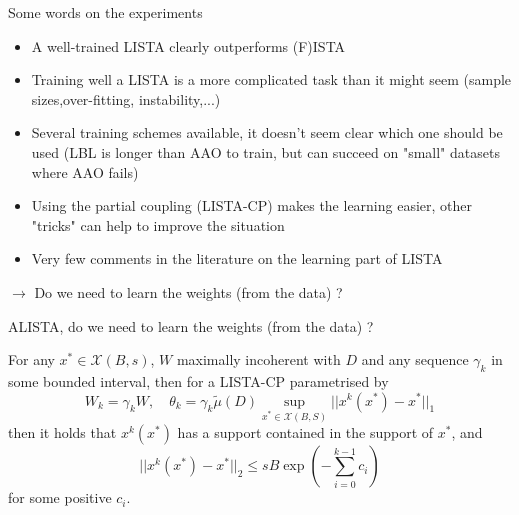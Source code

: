 \documentclass{beamer}
\begin{document}
\begin{frame}{Some words on the experiments}
    \begin{itemize}
        \item A well-trained LISTA clearly outperforms (F)ISTA
        \item Training well a LISTA is a more complicated task than it might seem (sample sizes,over-fitting, instability,...)
        \item Several training schemes available, it doesn't seem clear which one should be used (LBL is longer than AAO to train, but can succeed on "small" datasets where AAO fails)
        \item Using the partial coupling (LISTA-CP) makes the learning easier, other "tricks" can help to improve the situation
        \item Very few comments in the literature on the learning part of LISTA
    \end{itemize}
    $\rightarrow$ Do we need to learn the weights (from the data) ?
\end{frame}

\begin{frame}{ALISTA, do we need to learn the weights (from the data) ?}
    \begin{theorem}
        For any $x^*\in\mathcal{X}(B,s)$, $W$ maximally incoherent with $D$ and any sequence $\gamma_k$ in some bounded interval, then for a LISTA-CP parametrised by
        \begin{equation*}
            W_k = \gamma_k W,\quad \theta_k = \gamma_k\tilde\mu(D)\sup_{x^*\in \mathcal{X}(B,S)} ||x^k(x^*) - x^*||_1
        \end{equation*}
        then it holds that $x^k(x^*)$ has a support contained in the support of $x^*$, and
        \begin{equation*}
            ||x^k(x^*) - x^*||_2 \leq sB\exp\left(-\sum_{i=0}^{k-1} c_i\right)
        \end{equation*}
        for some positive $c_i$.
    \end{theorem}
\end{frame}
\end{document}
